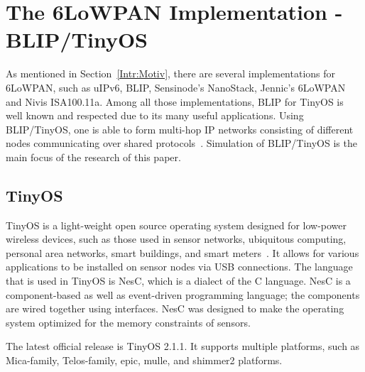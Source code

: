 \chapter{The 6LoWPAN Implementation - BLIP/TinyOS}
\label{Blip/TinyOS}
As mentioned in Section~\ref{Intr:Motiv}, there are several implementations for 6LoWPAN, such as uIPv6, BLIP, Sensinode's NanoStack, Jennic's 6LoWPAN and Nivis ISA100.11a. Among all those implementations, BLIP for TinyOS is well known and respected due to its many useful applications. Using BLIP/TinyOS, one is able to form multi-hop IP networks consisting of different nodes communicating over shared protocols~\cite{BLIP}. Simulation of BLIP/TinyOS is the main focus of the research of this paper.

\section{TinyOS}
\label{TinyOS}
TinyOS is a light-weight open source operating system designed for low-power wireless devices, such as those used in sensor networks, ubiquitous computing, personal area networks, smart buildings, and smart meters~\cite{TinyOS}. It allows for various applications to be installed on sensor nodes via USB connections. The language that is used in TinyOS is NesC, which is a dialect of the C language. NesC is a component-based as well as event-driven programming language; the components are wired together using interfaces. NesC was designed to make the operating system optimized for the memory constraints of sensors.

The latest official release is TinyOS 2.1.1. It supports multiple platforms, such as Mica-family, Telos-family, epic, mulle, and shimmer2 platforms.

